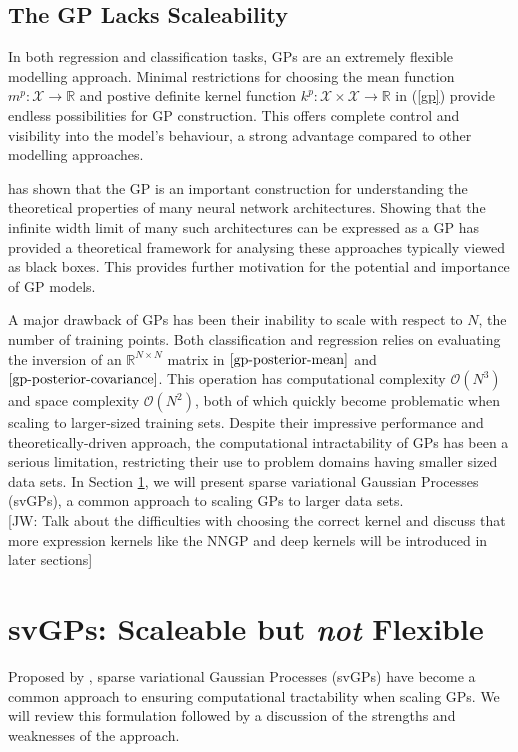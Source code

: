 \documentclass{article}
\newcommand{\jw}[1]{{\color{gray} [JW: #1]}}
\numberwithin{equation}{section}
\begin{document}
\subsection{The GP Lacks Scaleability}\label{section:gp-problems}
In both regression and classification tasks, GPs are an extremely flexible modelling approach. Minimal restrictions for choosing the mean function $m^p: \mathcal{X} \rightarrow \mathbb{R}$ and postive definite kernel function $k^p: \mathcal{X} \times \mathcal{X} \rightarrow \mathbb{R}$ in (\ref{gp}) provide endless possibilities for GP construction. This offers complete control and visibility into the model's behaviour, a strong advantage compared to other modelling approaches. 

\cite{novak2019neural} has shown that the GP is an important construction for understanding the theoretical properties of many neural network architectures. Showing that the infinite width limit of many such architectures can be expressed as a GP has provided a theoretical framework for analysing these approaches typically viewed as black boxes. This provides further motivation for the potential and importance of GP models.

A major drawback of GPs has been their inability to scale with respect to $N$, the number of training points. Both classification and regression relies on evaluating the inversion of an $\mathbb{R}^{N \times N}$ matrix in $\ref{gp-posterior-mean}$ and $\ref{gp-posterior-covariance}$. This operation has computational complexity $\mathcal{O}(N^3)$ and space complexity $\mathcal{O}(N^2)$, both of which quickly become problematic when scaling to larger-sized training sets. Despite their impressive performance and theoretically-driven approach, the computational intractability of GPs has been a serious limitation, restricting their use to problem domains having smaller sized data sets. In Section \ref{section:the-svgp}, we will present sparse variational Gaussian Processes (svGPs), a common approach to scaling GPs to larger data sets.
\\\jw{Talk about the difficulties with choosing the correct kernel and discuss that more expression kernels like the NNGP and deep kernels will be introduced in later sections}

\newpage
\section{svGPs: Scaleable but \textit{not} Flexible}\label{section:the-svgp}
Proposed by \cite{titsias2009variational}, sparse variational Gaussian Processes (svGPs) have become a common approach to ensuring computational tractability when scaling GPs. We will review this formulation followed by a discussion of the strengths and weaknesses of the approach.
\end{document}
